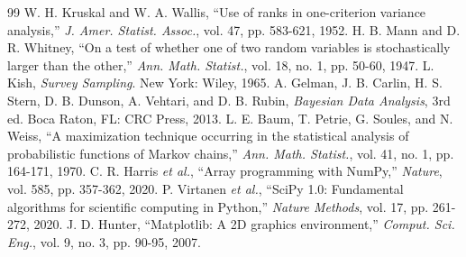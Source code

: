 \documentclass[conference]{IEEEtran}
\begin{document}
\begin{thebibliography}{99}
 W. H. Kruskal and W. A. Wallis, ``Use of ranks in one-criterion variance analysis,'' \emph{J. Amer. Statist. Assoc.}, vol. 47, pp. 583-621, 1952.
 H. B. Mann and D. R. Whitney, ``On a test of whether one of two random variables is stochastically larger than the other,'' \emph{Ann. Math. Statist.}, vol. 18, no. 1, pp. 50-60, 1947.
 L. Kish, \emph{Survey Sampling}. New York: Wiley, 1965.
 A. Gelman, J. B. Carlin, H. S. Stern, D. B. Dunson, A. Vehtari, and D. B. Rubin, \emph{Bayesian Data Analysis}, 3rd ed. Boca Raton, FL: CRC Press, 2013.
 L. E. Baum, T. Petrie, G. Soules, and N. Weiss, ``A maximization technique occurring in the statistical analysis of probabilistic functions of Markov chains,'' \emph{Ann. Math. Statist.}, vol. 41, no. 1, pp. 164-171, 1970.
 C. R. Harris \emph{et al.}, ``Array programming with NumPy,'' \emph{Nature}, vol. 585, pp. 357-362, 2020.
 P. Virtanen \emph{et al.}, ``SciPy 1.0: Fundamental algorithms for scientific computing in Python,'' \emph{Nature Methods}, vol. 17, pp. 261-272, 2020.
 J. D. Hunter, ``Matplotlib: A 2D graphics environment,'' \emph{Comput. Sci. Eng.}, vol. 9, no. 3, pp. 90-95, 2007.
\end{thebibliography}
\end{document}
